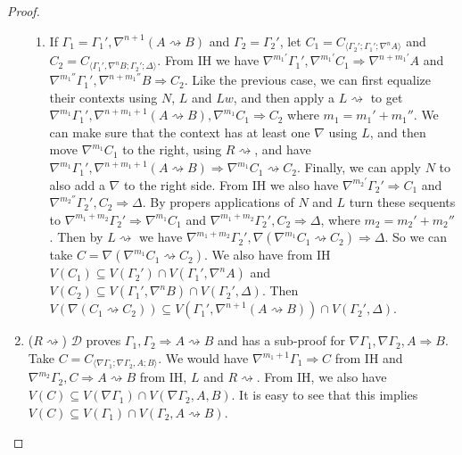 \documentclass[12pt,a4paper]{article}
\theoremstyle{plain}
\theoremstyle{definition}
\begin{document}
\begin{proof}
\begin{enumerate}
\begin{enumerate}
			\item If $\Gamma_1 = \Gamma_1' , \nabla^{n+1} (A \rightsquigarrow B)$ and $\Gamma_2 = \Gamma_2'$, let $C_1 = C_{\langle\Gamma_2';\Gamma_1';\nabla^n A\rangle}$ and $C_2 = C_{\langle\Gamma_1',\nabla^n B;\Gamma_2';\Delta\rangle}$.
			From IH we have $\nabla^{m_1'} \Gamma_1', \nabla^{m_1'} C_1 \Rightarrow \nabla^{n+m_1'} A$ and $\nabla^{m_1''} \Gamma_1',\nabla^{n+m_1''} B \Rightarrow C_2$. Like the previous case, we can first equalize their contexts using $N$, $L$ and $Lw$, and then apply a $L\rightsquigarrow$ to get $\nabla^{m_1} \Gamma_1',\nabla^{n+m_1+1}(A \rightsquigarrow B) , \nabla^{m_1} C_1 \Rightarrow C_2$ where $m_1 = m_1'+m_1''$. We can make sure that the context has at least one $\nabla$ using $L$, and then move $\nabla^{m_1} C_1$ to the right, using $R\rightsquigarrow$, and have $\nabla^{m_1} \Gamma_1',\nabla^{n+m_1+1}(A \rightsquigarrow B) \Rightarrow \nabla^{m_1} C_1 \rightsquigarrow C_2$. Finally, we can apply $N$ to also add a $\nabla$ to the right side.
			From IH we also have $\nabla^{m_2'} \Gamma_2' \Rightarrow C_1$ and $\nabla^{m_2''} \Gamma_2' , C_2 \Rightarrow \Delta$. By propers applications of $N$ and $L$ turn these sequents to $\nabla^{m_1+m_2} \Gamma_2' \Rightarrow \nabla^{m_1} C_1$ and $\nabla^{m_1+m_2} \Gamma_2' , C_2 \Rightarrow \Delta$, where $m_2 = m_2'+m_2''$. Then by $L\rightsquigarrow$ we have $\nabla^{m_1+m_2} \Gamma_2' , \nabla (\nabla^{m_1} C_1 \rightsquigarrow C_2) \Rightarrow \Delta$. So we can take $C = \nabla (\nabla^{m_1} C_1 \rightsquigarrow C_2)$. We also have from IH $V(C_1) \subseteq V(\Gamma_2') \cap V(\Gamma_1' , \nabla^n A)$ and $V(C_2) \subseteq V(\Gamma_1' , \nabla^n B) \cap V(\Gamma_2' , \Delta)$. Then $V(\nabla (C_1 \rightsquigarrow C_2)) \subseteq V(\Gamma_1' , \nabla^{n+1} (A \rightsquigarrow B)) \cap V(\Gamma_2' , \Delta)$.
		\end{enumerate}

		\item ($R\rightsquigarrow$) $\mathcal{D}$ proves $\Gamma_1, \Gamma_2 \Rightarrow A \rightsquigarrow B$ and has a sub-proof for $\nabla \Gamma_1, \nabla \Gamma_2, A \Rightarrow B$. Take $C = C_{\langle\nabla\Gamma_1;\nabla\Gamma_2,A;B\rangle}$. We would have $\nabla^{m_1+1}\Gamma_1 \Rightarrow C$ from IH and $\nabla^{m_2}\Gamma_2, C \Rightarrow A \rightsquigarrow B$ from IH, $L$ and $R\rightsquigarrow$. From IH, we also have $V(C) \subseteq V(\nabla\Gamma_1) \cap V(\nabla\Gamma_2,A,B)$. It is easy to see that this implies $V(C) \subseteq V(\Gamma_1) \cap V(\Gamma_2,A \rightsquigarrow B)$.


\end{enumerate}
\end{proof}
\end{document}
